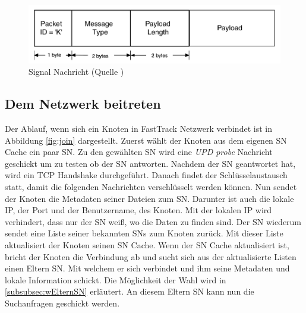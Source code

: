 \begin{figure}
\includegraphics[scale=0.25]{gfx/signal_message}
\caption{Signal Nachricht (Quelle \cite{liang2006fasttrack})}
\label{fig:sigN}
\end{figure}

\subsection{Dem Netzwerk beitreten}
\label{subsec:join}

Der Ablauf, wenn sich ein Knoten in FastTrack Netzwerk verbindet ist in Abbildung \ref{fig:join} dargestellt.
Zuerst wählt der Knoten aus dem eigenen SN Cache ein paar SN.
Zu den gewählten SN wird eine \textit{UPD probe} Nachricht geschickt um zu testen ob der SN antworten.
Nachdem der SN geantwortet hat, wird ein TCP Handshake durchgeführt. 
Danach findet der Schlüsselaustausch statt, damit die folgenden Nachrichten verschlüsselt werden können.
Nun sendet der Knoten die Metadaten seiner Dateien zum SN.
Darunter ist auch die lokale IP, der Port und der Benutzername, des Knoten.
Mit der lokalen IP wird verhindert, dass nur der SN weiß, wo die Daten zu finden sind.
Der SN wiederum sendet eine Liste seiner bekannten SNs zum Knoten zurück.
Mit dieser Liste aktualisiert der Knoten seinen SN Cache.
Wenn der SN Cache aktualisiert ist, bricht der Knoten die Verbindung ab und sucht sich aus der aktualisierte Listen einen Eltern SN. 
Mit welchem er sich verbindet und ihm seine Metadaten und lokale Information schickt.
Die Möglichkeit der Wahl wird in \ref{subsubsec:wElternSN} erläutert.
An diesem Eltern SN kann nun die Suchanfragen geschickt werden.

